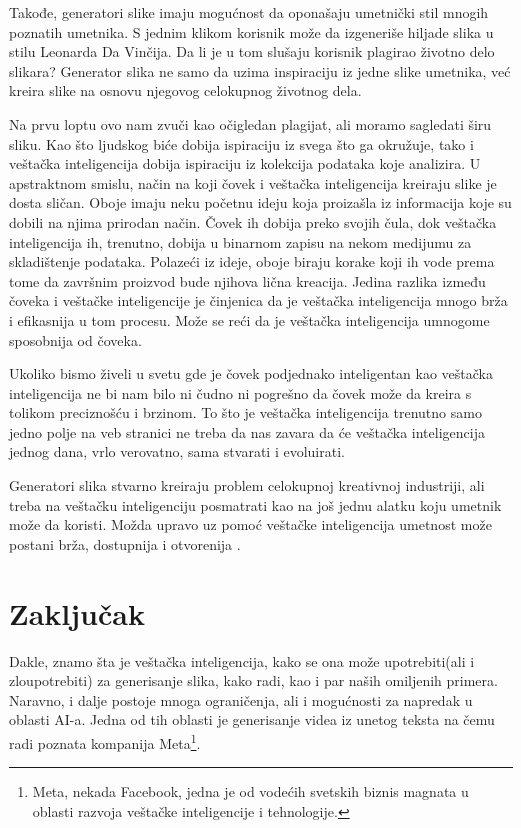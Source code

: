 \documentclass[12pt, letterpaper]{article}
\begin{document}
Takođe, generatori slike imaju mogućnost da oponašaju umetnički stil mnogih poznatih umetnika. S jednim klikom korisnik može da izgeneriše hiljade slika u stilu Leonarda Da Vinčija. Da li je u tom slušaju korisnik plagirao životno delo slikara? Generator slika ne samo da uzima inspiraciju iz jedne slike umetnika, već kreira slike na osnovu njegovog celokupnog životnog dela.

Na prvu loptu ovo nam zvuči kao očigledan plagijat, ali moramo sagledati širu sliku. Kao što ljudskog biće dobija ispiraciju iz svega što ga okružuje, tako i veštačka inteligencija dobija ispiraciju iz kolekcija podataka koje analizira. U apstraktnom smislu, način na koji čovek i veštačka inteligencija kreiraju slike je dosta sličan. Oboje imaju neku početnu ideju koja proizašla iz informacija koje su dobili na njima prirodan način. Čovek ih dobija preko svojih čula, dok veštačka inteligencija ih, trenutno, dobija u binarnom zapisu na nekom medijumu za skladištenje podataka. Polazeći iz ideje, oboje biraju korake koji ih vode prema tome da završnim proizvod bude njihova lična kreacija. Jedina razlika između čoveka i veštačke inteligencije je činjenica da je veštačka inteligencija mnogo brža i efikasnija u tom procesu. Može se reći da je veštačka inteligencija umnogome sposobnija od čoveka. 

Ukoliko bismo živeli u svetu gde je čovek podjednako inteligentan kao veštačka inteligencija ne bi nam bilo ni čudno ni pogrešno da čovek može da kreira s tolikom preciznošću i brzinom. To što je veštačka inteligencija trenutno samo jedno polje na veb stranici ne treba da nas zavara da će veštačka inteligencija jednog dana, vrlo verovatno, sama stvarati i evoluirati.

Generatori slika stvarno kreiraju problem celokupnoj kreativnoj industriji, ali treba na veštačku inteligenciju posmatrati kao na još jednu alatku koju umetnik može da koristi. Možda upravo uz pomoć veštačke inteligencija umetnost može postani brža, dostupnija i otvorenija \cite{fear}.

\section{Zaključak}

Dakle, znamo šta je veštačka inteligencija, kako se ona može upotrebiti(ali i zloupotrebiti) za generisanje slika, kako radi, kao i par naših omiljenih primera. Naravno, i dalje postoje mnoga ograničenja, ali i mogućnosti za napredak u oblasti AI-a. Jedna od tih oblasti je generisanje videa iz unetog teksta na čemu radi poznata kompanija Meta\footnote{Meta, nekada Facebook, jedna je od vodećih svetskih biznis magnata u oblasti razvoja veštačke inteligencije i tehnologije.}. 
\end{document}
